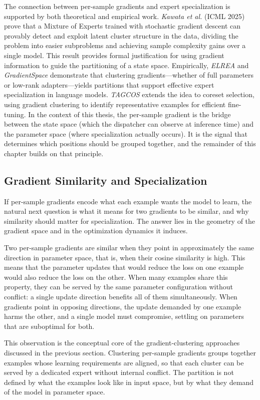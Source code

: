 The connection between per-sample gradients and expert specialization is supported by both theoretical and empirical work. \emph{Kawata et al.} (ICML 2025) prove that a Mixture of Experts trained with stochastic gradient descent can provably detect and exploit latent cluster structure in the data, dividing the problem into easier subproblems and achieving sample complexity gains over a single model. This result provides formal justification for using gradient information to guide the partitioning of a state space. Empirically, \emph{ELREA} and \emph{GradientSpace} demonstrate that clustering gradients---whether of full parameters or low-rank adapters---yields partitions that support effective expert specialization in language models. \emph{TAGCOS} extends the idea to coreset selection, using gradient clustering to identify representative examples for efficient fine-tuning. In the context of this thesis, the per-sample gradient is the bridge between the state space (which the dispatcher can observe at inference time) and the parameter space (where specialization actually occurs). It is the signal that determines which positions should be grouped together, and the remainder of this chapter builds on that principle.


\subsection{Gradient Similarity and Specialization}

If per-sample gradients encode what each example wants the model to learn, the natural next question is what it means for two gradients to be similar, and why similarity should matter for specialization. The answer lies in the geometry of the gradient space and in the optimization dynamics it induces.

Two per-sample gradients are similar when they point in approximately the same direction in parameter space, that is, when their cosine similarity is high. This means that the parameter updates that would reduce the loss on one example would also reduce the loss on the other. When many examples share this property, they can be served by the same parameter configuration without conflict: a single update direction benefits all of them simultaneously. When gradients point in opposing directions, the update demanded by one example harms the other, and a single model must compromise, settling on parameters that are suboptimal for both.

This observation is the conceptual core of the gradient-clustering approaches discussed in the previous section. Clustering per-sample gradients groups together examples whose learning requirements are aligned, so that each cluster can be served by a dedicated expert without internal conflict. The partition is not defined by what the examples look like in input space, but by what they demand of the model in parameter space.

